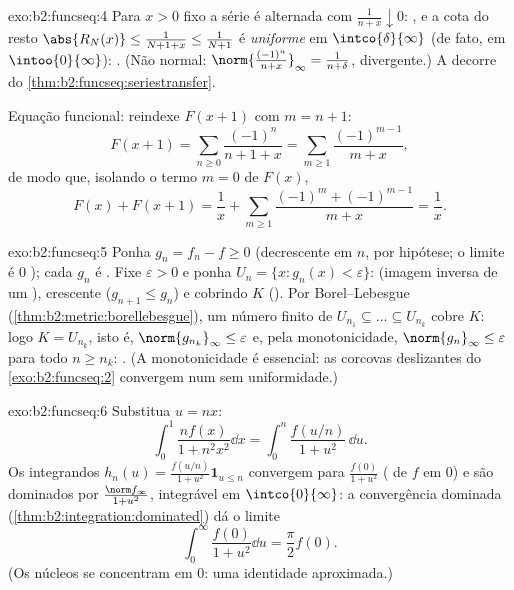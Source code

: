 \begin{solution}{exo:b2:funcseq:4}
Para $x > 0$ fixo a série é alternada com $\frac{1}{n + x}
\downarrow 0$: , e a cota do resto
$\abs{R_N(x)} \leq \frac{1}{N + 1 + x} \leq \frac{1}{N+1}$ é
\emph{uniforme} em $\intco{\delta}{\infty}$ (de fato, em
$\intoo{0}{\infty}$): . (Não normal:
$\norm{\frac{(-1)^n}{n+x}}_\infty = \frac{1}{n + \delta}$,
divergente.) A  decorre do
\cref{thm:b2:funcseq:seriestransfer}.

Equação funcional: reindexe $F(x + 1)$ com $m = n + 1$:
\[
F(x+1) = \sum_{n\geq0} \frac{(-1)^n}{n + 1 + x}
= \sum_{m\geq1}\frac{(-1)^{m-1}}{m+x} ,
\]
de modo que, isolando o termo $m = 0$ de $F(x)$,
\[
F(x) + F(x+1)
= \frac{1}{x} + \sum_{m\geq1}
\frac{(-1)^m + (-1)^{m-1}}{m+x} = \frac1x .
\]
\end{solution}

\begin{solution}{exo:b2:funcseq:5}
Ponha $g_n = f_n - f \geq 0$ (decrescente em $n$, por hipótese; o
limite é $0$ ); cada $g_n$ é . Fixe $\varepsilon
> 0$ e ponha $U_n = \{x : g_n(x) < \varepsilon\}$:  (imagem inversa
de um ), crescente ($g_{n+1} \leq g_n$) e cobrindo $K$
(). Por Borel--Lebesgue
(\cref{thm:b2:metric:borellebesgue}), um número finito de $U_{n_1}
\subseteq \dots \subseteq U_{n_k}$ cobre $K$: logo $K = U_{n_k}$,
isto é, $\norm{g_{n_k}}_\infty \leq \varepsilon$ e, pela monotonicidade,
$\norm{g_n}_\infty \leq \varepsilon$ para todo $n \geq n_k$: . (A monotonicidade é essencial: as corcovas deslizantes do
\cref{exo:b2:funcseq:2} convergem  num  sem
uniformidade.)
\end{solution}

\begin{solution}{exo:b2:funcseq:6}
Substitua $u = nx$:
\[
\int_0^1 \frac{n f(x)}{1 + n^2x^2}\dd x
= \int_0^n \frac{f(u/n)}{1 + u^2}\,\dd u .
\]
Os integrandos $h_n(u) = \frac{f(u/n)}{1+u^2}\mathbf{1}_{u \leq n}$
convergem  para $\frac{f(0)}{1+u^2}$ ( de $f$ em
$0$) e são dominados por $\frac{\norm f_\infty}{1 + u^2}$,
integrável em $\intco{0}{\infty}$: a convergência dominada
(\cref{thm:b2:integration:dominated}) dá o limite
\[
\int_0^\infty \frac{f(0)}{1 + u^2}\dd u = \frac{\pi}{2} f(0) .
\]
(Os núcleos se concentram em $0$: uma identidade aproximada.)
\end{solution}

